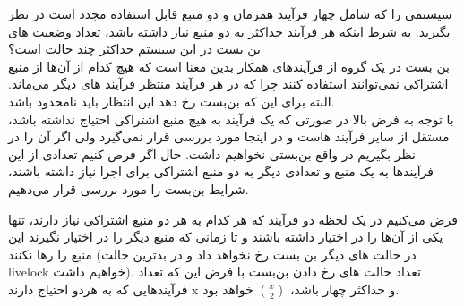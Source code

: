 \documentclass[]{article}
\begin{document}
سیستمی را که شامل چهار فرآیند همزمان و دو منبع قابل استفاده مجدد است در نظر بگیرید. به شرط اینکه هر فرآیند حداکثر به دو منبع
نیاز داشته باشد، تعداد وضعیت های بن بست
در این سیستم حداکثر چند حالت است؟
\\
بن بست در یک گروه از فرآیندهای همکار بدین معنا است که هیچ کدام از آن‌ها از منبع اشتراکی
نمی‌توانند استفاده کنند چرا که در هر فرآیند منتظر فرآیند های دیگر می‌ماند.
البته برای این که بن‌بست رخ دهد این انتظار باید نامحدود باشد.
\\
با توجه به فرض بالا در صورتی که یک فرآیند به هیچ منبع اشتراکی احتیاج نداشته باشد، مستقل از
سایر فرآیند هاست و در اینجا مورد بررسی قرار نمی‌گیرد ولی اگر آن را در نظر بگیریم در واقع بن‌بستی نخواهیم داشت.
حال اگر فرض کنیم تعدادی از این فرآیندها به یک منبع و تعدادی دیگر به دو منبع اشتراکی برای اجرا نیاز داشته باشند،
شرایط بن‌بست را مورد بررسی قرار می‌دهیم.

فرض می‌کنیم در یک لحظه دو فرآیند که هر کدام به هر دو منبع اشتراکی نیاز دارند،
تنها یکی از آن‌ها را در اختیار داشته باشند و تا زمانی که منبع دیگر را در اختیار نگیرند این منبع را رها نکنند
(در حالت های دیگر بن بست رخ نخواهد داد و در بدترین حالت livelock خواهیم داشت).
تعداد حالت های رخ دادن بن‌بست با فرض این که تعداد فرآیندهایی که به هردو احتیاج دارند x و حداکثر چهار باشد،
$\binom{x}{2}$ خواهد بود.
\end{document}

